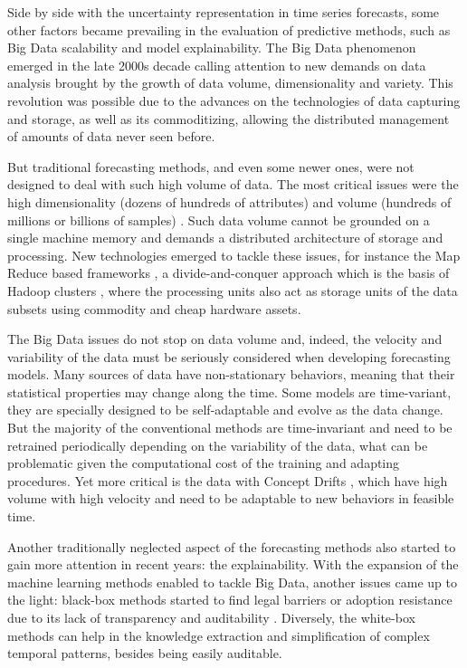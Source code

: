 Side by side with the uncertainty representation in time series forecasts, some other factors became prevailing in the evaluation of predictive methods, such as Big Data scalability and model explainability. The Big Data phenomenon emerged in the late 2000s decade \cite{Lynch2008} calling attention to new demands on data analysis brought by the growth of data volume, dimensionality and variety. This revolution was possible due to the advances on the technologies of data capturing and storage, as well as its commoditizing, allowing the distributed management of amounts of data never seen before. 

But traditional forecasting methods, and even some newer ones, were not designed to deal with such high volume of data. The most critical issues were the high dimensionality  (dozens of hundreds of attributes) and volume (hundreds of millions or billions of samples) \cite{Qiu2016}. Such data volume cannot be grounded on a single machine memory and demands a distributed architecture of storage and processing. New technologies emerged to tackle these issues, for instance the Map Reduce based frameworks \cite{Dean2008}, a divide-and-conquer approach which is the basis of Hadoop clusters \cite{White2012}, where the processing units also act as storage units of the data subsets using commodity and cheap hardware assets.

The Big Data issues do not stop on data volume and, indeed, the velocity and variability of the data must be seriously considered when developing forecasting models. Many sources of data have non-stationary behaviors, meaning that their statistical properties may change along the time. Some models are time-variant, they are specially designed to be self-adaptable and evolve as the data change. But the majority of the  conventional methods are time-invariant and need to be retrained periodically depending on the variability of the data, what can be problematic given the computational cost of the training and adapting procedures. Yet more critical is the data with Concept Drifts \citep{Gama2014}, which have high volume with high velocity and need to be adaptable to new behaviors in feasible time. 

Another traditionally neglected aspect of the forecasting methods also started to gain more attention in recent years: the explainability. With the expansion of the machine learning methods enabled to tackle Big Data, another issues came up to the light: black-box methods started to find legal barriers or adoption resistance due to its lack of transparency and auditability \citep{Leslie2019, ECAIHLEG2019}. Diversely, the white-box methods can help in the knowledge extraction and simplification of complex temporal patterns, besides being easily auditable.

